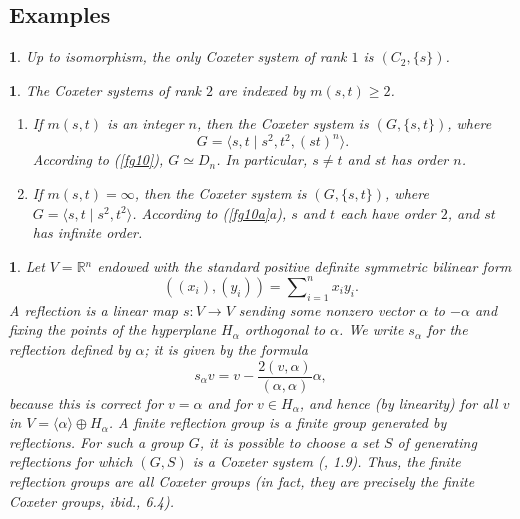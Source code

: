 \documentclass[a4paper,11pt,final,openany]{memoir}%
\newtheorem{plain}[X]{}
\theoremstyle{nonumberplain}
\begin{document}
\subsection{Examples}

\begin{plain}
\label{fg12}Up to isomorphism, the only Coxeter system of rank $1$ is
$(C_{2},\{s\})$.
\end{plain}

\begin{plain}
\label{fg13}The Coxeter systems of rank $2$ are indexed by $m(s,t)\geq2$.

\begin{enumerate}
\item If $m(s,t)$ is an integer $n$, then the Coxeter system is $(G,\{s,t\})$,
where
\[
G=\langle s,t\mid s^{2},t^{2},(st)^{n}\rangle\text{.}%
\]
According to (\ref{fg10}), $G\simeq D_{n}$. In particular, $s\neq t$ and $st$
has order $n$.

\item If $m(s,t)=\infty$, then the Coxeter system is $(G,\{s,t\})$, where
$G=\langle s,t\mid s^{2},t^{2}\rangle$. According to (\ref{fg10a}a), $s$ and
$t$ each have order $2$, and $st$ has infinite order.
\end{enumerate}
\end{plain}

\begin{plain}
\label{fg14}Let $V=\mathbb{R}{}^{n}$ endowed with the standard positive
definite symmetric bilinear form%
\[
((x_{i}),(y_{i}))=\sum\nolimits_{i=1}^{n}x_{i}y_{i}.
\]
A \emph{reflection}%
is a linear map $s\colon V\rightarrow V$ sending some nonzero vector $\alpha$
to $-\alpha$ and fixing the points of the hyperplane $H_{\alpha}$ orthogonal
to $\alpha$. We write $s_{\alpha}$ for the reflection defined by $\alpha$; it
is given by the formula%
\[
s_{\alpha}v=v-\frac{2(v,\alpha)}{(\alpha,\alpha)}\alpha,
\]
because this is correct for $v=\alpha$ and for $v\in H_{\alpha}$, and hence
(by linearity) for all $v$ in $V=\langle\alpha\rangle\oplus H_{\alpha}$. A
\emph{finite reflection group}%
%
is a finite group generated by reflections. For such a group $G$, it is
possible to choose a set $S$ of generating reflections for which $(G,S)$ is a
Coxeter system (\cite{humphreys1990}, 1.9). Thus, the finite reflection groups
are all Coxeter groups (in fact, they are precisely the finite Coxeter groups,
ibid., 6.4).
\end{plain}
\end{document}
